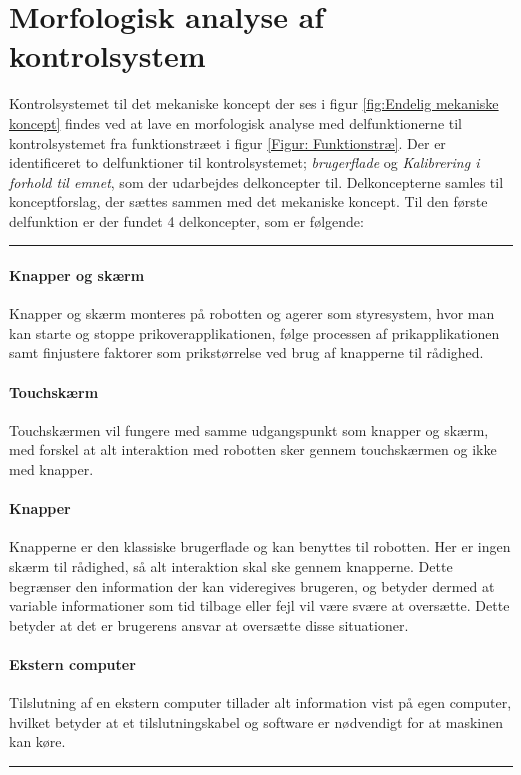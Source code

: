 \section{Morfologisk analyse af kontrolsystem} \label{Morf - kontrolsystem}

Kontrolsystemet til det mekaniske koncept der ses i figur \ref{fig:Endelig mekaniske koncept} findes ved at lave en morfologisk analyse med delfunktionerne til kontrolsystemet fra funktionstræet i figur \ref{Figur: Funktionstræ}. Der er identificeret to delfunktioner til kontrolsystemet; \textit{brugerflade} og \textit{Kalibrering i forhold til emnet}, som der udarbejdes delkoncepter til. Delkoncepterne samles til konceptforslag, der sættes sammen med det mekaniske koncept. Til den første delfunktion er der fundet 4 delkoncepter, som er følgende: \plainbreak{0.5}
\paragraph{Knapper og skærm}
Knapper og skærm monteres på robotten og agerer som styresystem, hvor man kan starte og stoppe prikoverapplikationen, følge processen af prikapplikationen samt finjustere faktorer som prikstørrelse ved brug af knapperne til rådighed.

\paragraph{Touchskærm}
Touchskærmen vil fungere med samme udgangspunkt som knapper og skærm, med forskel at alt interaktion med robotten sker gennem touchskærmen og ikke med knapper.

\paragraph{Knapper}
Knapperne er den klassiske brugerflade og kan benyttes til robotten. Her er ingen skærm til rådighed, så alt interaktion skal ske gennem knapperne. Dette begrænser den information der kan videregives brugeren, og betyder dermed at variable informationer som tid tilbage eller fejl vil være svære at oversætte. Dette betyder at det er brugerens ansvar at oversætte disse situationer.

\paragraph{Ekstern computer}
Tilslutning af en ekstern computer tillader alt information vist på egen computer, hvilket betyder at et tilslutningskabel og software er nødvendigt for at maskinen kan køre.
\plainbreak{1}


